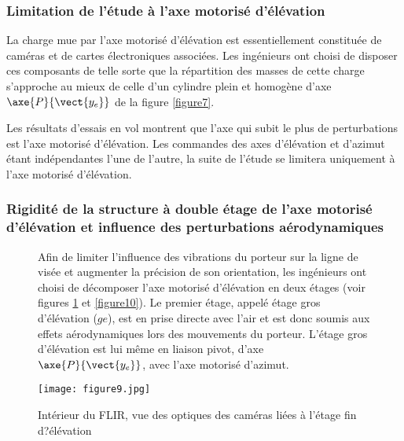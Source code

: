\subsubsection{Limitation de l'étude à l'axe motorisé d'élévation}

La charge mue par l'axe motorisé d'élévation est essentiellement constituée de caméras et de cartes électroniques
associées. Les ingénieurs ont choisi de disposer ces composants de telle sorte que la répartition des masses de
cette charge s'approche au mieux de celle d'un cylindre plein et homogène d'axe $\axe{P}{\vect{y_e}}$ de la figure \ref{figure7}.


Les résultats d'essais en vol montrent que l'axe qui subit le plus de perturbations est l'axe motorisé d'élévation.
Les commandes des axes d'élévation et d'azimut étant indépendantes l'une de l'autre, la suite de l'étude se
limitera uniquement à l'axe motorisé d'élévation.

\subsubsection{Rigidité de la structure à double étage de l'axe motorisé d'élévation et influence des
perturbations aérodynamiques}

\begin{figure}[!htb]
\begin{center}
\begin{minipage}{0.45\textwidth}
Afin de limiter l'influence des vibrations du porteur sur la
ligne de visée et augmenter la précision de son orientation,
les ingénieurs ont choisi de décomposer l'axe motorisé
d'élévation en deux étages (voir figures \ref{fig9} et \ref{figure10}).
Le premier étage, appelé étage gros d'élévation ($ge$), est
en prise directe avec l'air et est donc soumis aux effets
aérodynamiques lors des mouvements du porteur. L'étage
gros d'élévation est lui même en liaison pivot, d'axe $\axe{P}{\vect{y_e}}$,
avec l'axe motorisé d'azimut.
\end{minipage}
\begin{minipage}{0.45\textwidth}
\begin{center}
\texttt{[image: figure9.jpg]}
\caption{Intérieur du FLIR, vue des optiques des
caméras liées à l'étage fin d?élévation\label{fig9}}
\end{center}
\end{minipage}
\end{center}
\end{figure}

